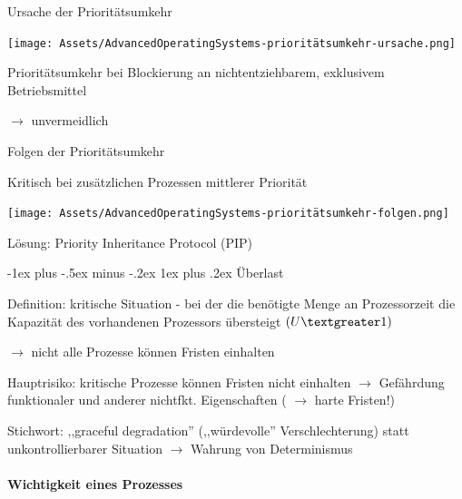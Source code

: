 \documentclass[a4paper]{article}
\makeatletter
\renewcommand{\subsubsection}{\@startsection{subsubsection}{3}{0mm}%
 {-1ex plus -.5ex minus -.2ex}%
 {1ex plus .2ex}%
 {\normalfont\small\bfseries}}
\makeatother
\begin{document}
\begin{multicols}{3}
    Ursache der Prioritätsumkehr
    \begin{itemize*}
        \item \texttt{[image: Assets/AdvancedOperatingSystems-prioritätsumkehr-ursache.png]}
        \item Prioritätsumkehr bei Blockierung an nichtentziehbarem, exklusivem Betriebsmittel
        \item $\rightarrow$ unvermeidlich
    \end{itemize*}

    Folgen der Prioritätsumkehr
    \begin{itemize*}
        \item Kritisch bei zusätzlichen Prozessen mittlerer Priorität
        \item \texttt{[image: Assets/AdvancedOperatingSystems-prioritätsumkehr-folgen.png]}
        \item Lösung: Priority Inheritance Protocol (PIP)
    \end{itemize*}

    \subsubsection{Überlast}

    \begin{itemize*}
        \item Definition: kritische Situation - bei der die benötigte Menge an
        Prozessorzeit die Kapazität des vorhandenen Prozessors übersteigt
        $(U\textgreater1)$
        \begin{itemize*}
            \item[$\rightarrow$] nicht alle Prozesse können Fristen einhalten
        \end{itemize*}
        \item Hauptrisiko: kritische Prozesse können Fristen nicht einhalten
        $\rightarrow$ Gefährdung funktionaler und anderer
        nichtfkt. Eigenschaften ( $\rightarrow$ harte Fristen!)
        \item Stichwort: ,,graceful degradation'' (,,würdevolle'' Verschlechterung)
        statt unkontrollierbarer Situation $\rightarrow$
        Wahrung von Determinismus
    \end{itemize*}


    \paragraph{Wichtigkeit eines
        Prozesses}


\end{multicols}
\end{document}

